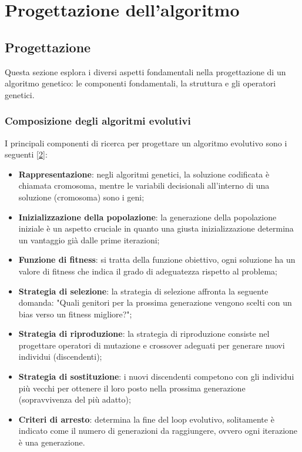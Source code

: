 \chapter{Progettazione dell'algoritmo}
\label{cap:analisi-requisiti}


\section{Progettazione}

Questa sezione esplora i diversi aspetti fondamentali nella progettazione di un algoritmo genetico: le componenti fondamentali, la struttura e gli operatori genetici.

\subsection{Composizione degli algoritmi evolutivi} \hypertarget{elementi}{}

I principali componenti di ricerca per progettare un algoritmo evolutivo sono i seguenti [\hyperlink{bibliografia}{2}]:

\begin{itemize}
    \item \textbf{Rappresentazione}: negli algoritmi genetici, la soluzione codificata è chiamata cromosoma, mentre le variabili decisionali all'interno di una soluzione (cromosoma) sono i geni;
    
    \item \textbf{Inizializzazione della popolazione}: la generazione della popolazione iniziale è un aspetto cruciale in quanto una giusta inizializzazione determina un vantaggio già dalle prime iterazioni;
    
    \item \textbf{Funzione di fitness}: si tratta della funzione obiettivo, ogni soluzione ha un valore di fitness che indica il grado di adeguatezza rispetto al problema;
    
    \item \textbf{Strategia di selezione}: la strategia di selezione affronta la seguente domanda: "Quali genitori per la prossima generazione vengono scelti con un bias verso un fitness migliore?";
    
    \item \textbf{Strategia di riproduzione}: la strategia di riproduzione consiste nel progettare operatori di mutazione e crossover adeguati per generare nuovi individui (discendenti);
    
    \item \textbf{Strategia di sostituzione}: i nuovi discendenti competono con gli individui più vecchi per ottenere il loro posto nella prossima generazione (sopravvivenza del più adatto);
    
    \item \textbf{Criteri di arresto}: determina la fine del loop evolutivo, solitamente è indicato come il numero di generazioni da raggiungere, ovvero ogni iterazione è una generazione.
\end{itemize}

